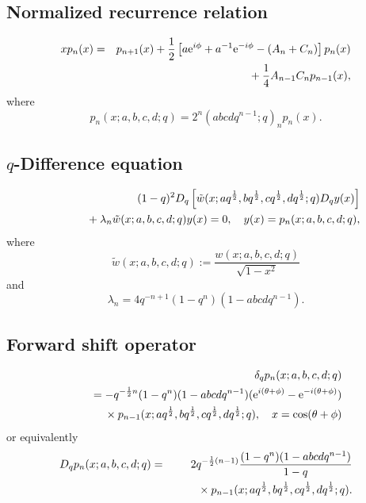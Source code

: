 \documentclass[envcountchap,graybox]{svmono}
\newcommand{\mathindent}{\hspace{7.5mm}}
\newcommand{\e}{\textrm{e}}
\begin{document}
\subsection*{Normalized recurrence relation}
\begin{eqnarray}
\label{NormRecContqHahn}
xp_n(x)&=&p_{n+1}(x)+\frac{1}{2}\left[a\e^{i\phi}+a^{-1}\e^{-i\phi}-(A_n+C_n)\right]p_n(x)\nonumber\\
& &{}\mathindent{}+\frac{1}{4}A_{n-1}C_np_{n-1}(x),
\end{eqnarray}
where
$$p_n(x;a,b,c,d;q)=2^n(abcdq^{n-1};q)_np_n(x).$$

\subsection*{$q$-Difference equation}
\begin{eqnarray}
\label{dvContqHahn}
& &(1-q)^2D_q\left[{\tilde w}(x;aq^{\frac{1}{2}},bq^{\frac{1}{2}},
cq^{\frac{1}{2}},dq^{\frac{1}{2}};q)D_qy(x)\right]\nonumber\\
& &{}\mathindent{}+\lambda_n{\tilde w}(x;a,b,c,d;q)y(x)=0,
\quad y(x)=p_n(x;a,b,c,d;q),
\end{eqnarray}
where
$${\tilde w}(x;a,b,c,d;q):=\frac{w(x;a,b,c,d;q)}{\sqrt{1-x^2}}$$
and
$$\lambda_n=4q^{-n+1}(1-q^n)(1-abcdq^{n-1}).$$

\subsection*{Forward shift operator}
\begin{eqnarray}
\label{shift1ContqHahnI}
& &\delta_q p_n(x;a,b,c,d;q)\nonumber\\
& &{}=-q^{-\frac{1}{2}n}(1-q^n)(1-abcdq^{n-1})(\e^{i(\theta+\phi)}-\e^{-i(\theta+\phi)})\nonumber\\
& &{}\mathindent{}\times p_{n-1}(x;aq^{\frac{1}{2}},bq^{\frac{1}{2}},cq^{\frac{1}{2}},dq^{\frac{1}{2}};q),
\quad x=\cos(\theta+\phi)
\end{eqnarray}
or equivalently
\begin{eqnarray}
\label{shift1ContqHahnII}
D_q p_n(x;a,b,c,d;q)&=&2q^{-\frac{1}{2}(n-1)}\frac{(1-q^n)(1-abcdq^{n-1})}{1-q}\nonumber\\
& &{}\mathindent{}\times p_{n-1}(x;aq^{\frac{1}{2}},bq^{\frac{1}{2}},cq^{\frac{1}{2}},dq^{\frac{1}{2}};q).
\end{eqnarray}

\newpage
\end{document}
